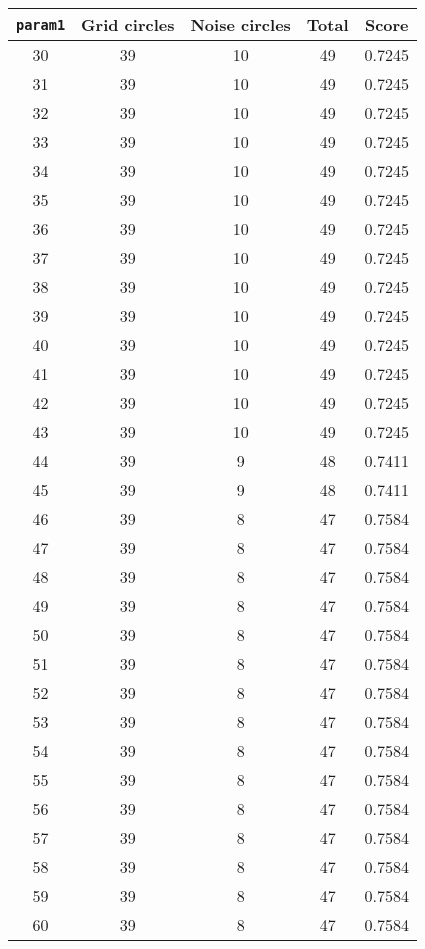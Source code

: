 \documentclass[letterpaper, 12pt]{article}
\begin{document}
\begin{longtable}{|c|c|c|c|c|}
\hline
\textbf{\texttt{param1}} & \textbf{Grid circles} & \textbf{Noise circles} & \textbf{Total} & \textbf{Score} \\
\hline
30 & 39 & 10 & 49 & 0.7245 \\
\hline
31 & 39 & 10 & 49 & 0.7245 \\
\hline
32 & 39 & 10 & 49 & 0.7245 \\
\hline
33 & 39 & 10 & 49 & 0.7245 \\
\hline
34 & 39 & 10 & 49 & 0.7245 \\
\hline
35 & 39 & 10 & 49 & 0.7245 \\
\hline
36 & 39 & 10 & 49 & 0.7245 \\
\hline
37 & 39 & 10 & 49 & 0.7245 \\
\hline
38 & 39 & 10 & 49 & 0.7245 \\
\hline
39 & 39 & 10 & 49 & 0.7245 \\
\hline
40 & 39 & 10 & 49 & 0.7245 \\
\hline
41 & 39 & 10 & 49 & 0.7245 \\
\hline
42 & 39 & 10 & 49 & 0.7245 \\
\hline
43 & 39 & 10 & 49 & 0.7245 \\
\hline
44 & 39 & 9 & 48 & 0.7411 \\
\hline
45 & 39 & 9 & 48 & 0.7411 \\
\hline
46 & 39 & 8 & 47 & 0.7584 \\
\hline
47 & 39 & 8 & 47 & 0.7584 \\
\hline
48 & 39 & 8 & 47 & 0.7584 \\
\hline
49 & 39 & 8 & 47 & 0.7584 \\
\hline
50 & 39 & 8 & 47 & 0.7584 \\
\hline
51 & 39 & 8 & 47 & 0.7584 \\
\hline
52 & 39 & 8 & 47 & 0.7584 \\
\hline
53 & 39 & 8 & 47 & 0.7584 \\
\hline
54 & 39 & 8 & 47 & 0.7584 \\
\hline
55 & 39 & 8 & 47 & 0.7584 \\
\hline
56 & 39 & 8 & 47 & 0.7584 \\
\hline
57 & 39 & 8 & 47 & 0.7584 \\
\hline
58 & 39 & 8 & 47 & 0.7584 \\
\hline
59 & 39 & 8 & 47 & 0.7584 \\
\hline
60 & 39 & 8 & 47 & 0.7584 \\
\hline

\end{longtable}
\end{document}
